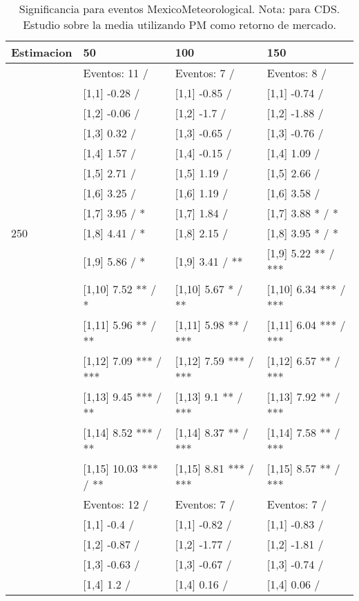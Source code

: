 \begin{table}

\caption{Significancia para eventos MexicoMeteorological. Nota: para CDS. Estudio sobre la media utilizando PM como retorno de mercado.}
\centering
\begin{tabular}[t]{llll}
\toprule
Estimacion & 50 & 100 & 150\\
\midrule
 & Eventos:  11 / & Eventos:  7 / & Eventos:  8 /\\
 & {}[1,1] -0.28  / & {}[1,1] -0.85  / & {}[1,1] -0.74  /\\
 & {}[1,2] -0.06  / & {}[1,2] -1.7  / & {}[1,2] -1.88  /\\
 & {}[1,3] 0.32  / & {}[1,3] -0.65  / & {}[1,3] -0.76  /\\
 & {}[1,4] 1.57  / & {}[1,4] -0.15  / & {}[1,4] 1.09  /\\
\addlinespace
 & {}[1,5] 2.71  / & {}[1,5] 1.19  / & {}[1,5] 2.66  /\\
 & {}[1,6] 3.25  / & {}[1,6] 1.19  / & {}[1,6] 3.58  /\\
 & {}[1,7] 3.95  / * & {}[1,7] 1.84  / & {}[1,7] 3.88 * / *\\
250 & {}[1,8] 4.41  / * & {}[1,8] 2.15  / & {}[1,8] 3.95 * / *\\
 & {}[1,9] 5.86  / * & {}[1,9] 3.41  / ** & {}[1,9] 5.22 ** / ***\\
\addlinespace
 & {}[1,10] 7.52 ** / * & {}[1,10] 5.67 * / ** & {}[1,10] 6.34 *** / ***\\
 & {}[1,11] 5.96 ** / ** & {}[1,11] 5.98 ** / *** & {}[1,11] 6.04 *** / ***\\
 & {}[1,12] 7.09 *** / *** & {}[1,12] 7.59 *** / *** & {}[1,12] 6.57 ** / ***\\
 & {}[1,13] 9.45 *** / ** & {}[1,13] 9.1 ** / *** & {}[1,13] 7.92 ** / ***\\
 & {}[1,14] 8.52 *** / ** & {}[1,14] 8.37 ** / *** & {}[1,14] 7.58 ** / ***\\
\addlinespace
 & {}[1,15] 10.03 *** / ** & {}[1,15] 8.81 *** / *** & {}[1,15] 8.57 ** / ***\\
 & Eventos:  12 / & Eventos:  7 / & Eventos:  7 /\\
 & {}[1,1] -0.4  / & {}[1,1] -0.82  / & {}[1,1] -0.83  /\\
 & {}[1,2] -0.87  / & {}[1,2] -1.77  / & {}[1,2] -1.81  /\\
 & {}[1,3] -0.63  / & {}[1,3] -0.67  / & {}[1,3] -0.74  /\\
\addlinespace
 & {}[1,4] 1.2  / & {}[1,4] 0.16  / & {}[1,4] 0.06  /\\

\end{tabular}
\end{table}
